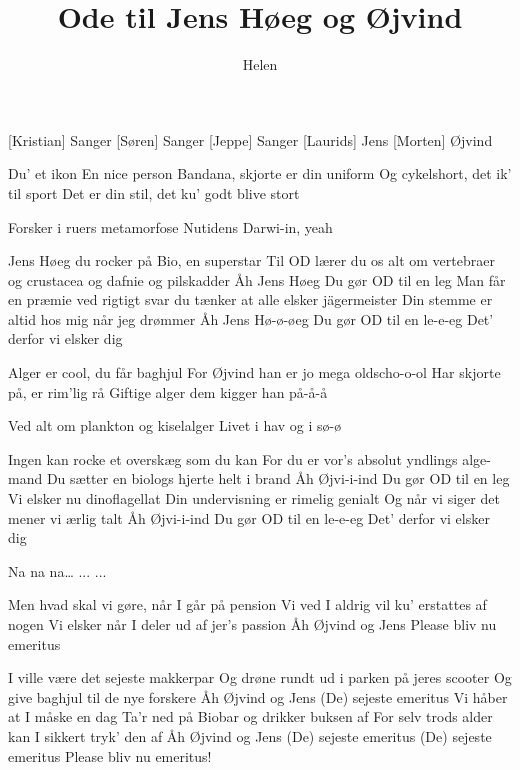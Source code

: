 \documentclass[a4paper,11pt]{article}
\title{Ode til Jens Høeg og Øjvind}
\author{Helen}
\begin{document}
\maketitle

\begin{roles}
  [Kristian] Sanger
  [Søren] Sanger
  [Jeppe] Sanger
  [Laurids] Jens
  [Morten] Øjvind
\end{roles}

\begin{center}
\end{center}

\begin{song}
Du’ et ikon
En nice person
 Bandana, skjorte er din uniform
Og cykelshort, det ik’ til sport
Det er din stil, det ku’ godt blive stort


Forsker i ruers metamorfose
Nutidens Darwi-in, yeah


Jens Høeg du rocker på Bio, en superstar
Til OD lærer du os alt om vertebraer
og crustacea og dafnie og pilskadder 
Åh Jens Høeg
Du gør OD til en leg
Man får en præmie ved rigtigt svar
du tænker at alle elsker jägermeister
Din stemme er altid hos mig når jeg drømmer
Åh Jens Hø-ø-øeg
Du gør OD til en le-e-eg
Det’ derfor vi elsker dig


Alger er cool, du får baghjul 
For Øjvind han er jo mega oldscho-o-ol
Har skjorte på, er rim’lig rå
Giftige alger dem kigger han på-å-å


Ved alt om plankton og kiselalger
Livet i hav og i sø-ø


Ingen kan rocke et overskæg som du kan
For du er vor's absolut yndlings alge-mand
Du sætter en biologs hjerte helt i brand 
Åh Øjvi-i-ind
Du gør OD til en leg
Vi elsker nu dinoflagellat
Din undervisning er rimelig genialt 
Og når vi siger det mener vi ærlig talt 
Åh Øjvi-i-ind
Du gør OD til en le-e-eg
Det’ derfor vi elsker dig


 Na na na… 
...
...




Men hvad skal vi gøre, når I går på pension
Vi ved I aldrig vil ku’ erstattes af nogen 
Vi elsker når I deler ud af jer's passion
Åh Øjvind og Jens 
Please bliv nu emeritus




I ville være det sejeste makkerpar 
Og drøne rundt ud i parken på jeres scooter 
Og give baghjul til de nye forskere
Åh Øjvind og Jens 
(De) sejeste emeritus
Vi håber at I måske en dag
Ta’r ned på Biobar og drikker buksen af
For selv trods alder kan I sikkert tryk’ den af
Åh Øjvind og Jens 
(De) sejeste emeritus
(De) sejeste emeritus
Please bliv nu emeritus!

\end{song}
\end{document}
